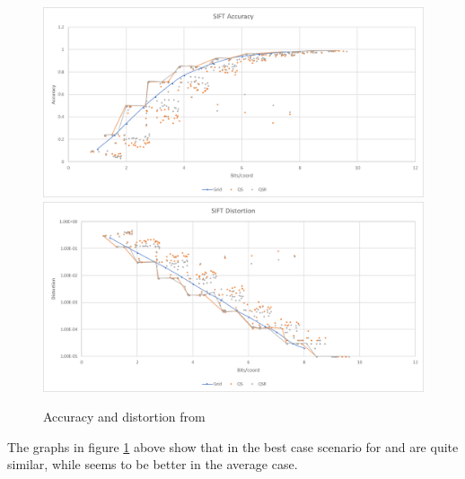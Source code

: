 \begin{figure}[h!]
\includegraphics[width=\textwidth]{figures/graphs/sift_accuracy}
\includegraphics[width=\textwidth]{figures/graphs/sift_distortion}
\caption{Accuracy and distortion from \sift{}}
\label{fig:graph sift}
\end{figure}
The graphs in figure \ref{fig:graph sift} above show that in the best case scenario for \qs{} and \qsr{} are quite similar, while \qsr{} seems to be better in the average case.

